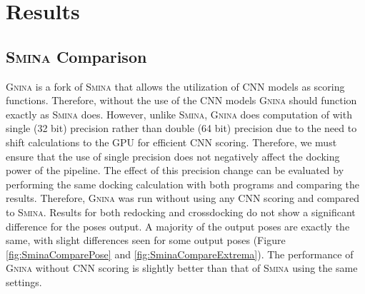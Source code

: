 \documentclass[journal=jcisd8,manuscript=article]{achemso}
\begin{document}
\section{Results}
\subsection{\textsc{Smina} Comparison}
\textsc{Gnina} is a fork of \textsc{Smina} that allows the utilization of CNN models as scoring functions. Therefore, without the use of the CNN models \textsc{Gnina} should function exactly as \textsc{Smina} does. However, unlike \textsc{Smina}, \textsc{Gnina} does computation of with single (32 bit) precision rather than double (64 bit) precision due to the need to shift calculations to the GPU for efficient CNN scoring. Therefore, we must ensure that the use of single precision does not negatively affect the docking power of the pipeline. The effect of this precision change can be evaluated by performing the same docking calculation with both programs and comparing the results.
Therefore, \textsc{Gnina} was run without using any CNN scoring and compared to \textsc{Smina}. Results for both redocking and crossdocking do not show a significant difference for the poses output. A majority of the output poses are exactly the same, with slight differences seen for some output poses (Figure \ref{fig:SminaComparePose} and \ref{fig:SminaCompareExtrema}). The performance of \textsc{Gnina} without CNN scoring is slightly better than that of \textsc{Smina} using the same settings.
\end{document}
